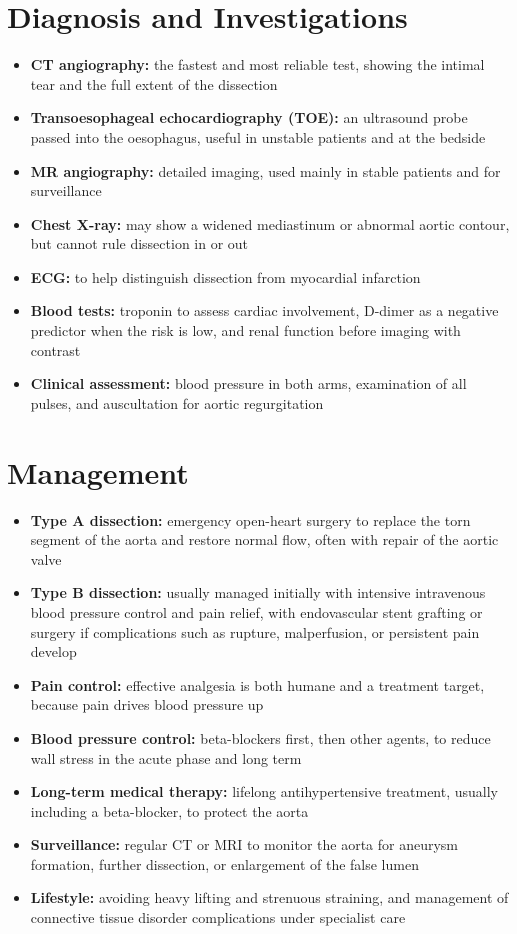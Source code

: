 \section*{Diagnosis and Investigations}
\begin{itemize}
    \item \textbf{CT angiography:} the fastest and most reliable test, showing the intimal tear and the full extent of the dissection
    \item \textbf{Transoesophageal echocardiography (TOE):} an ultrasound probe passed into the oesophagus, useful in unstable patients and at the bedside
    \item \textbf{MR angiography:} detailed imaging, used mainly in stable patients and for surveillance
    \item \textbf{Chest X-ray:} may show a widened mediastinum or abnormal aortic contour, but cannot rule dissection in or out
    \item \textbf{ECG:} to help distinguish dissection from myocardial infarction
    \item \textbf{Blood tests:} troponin to assess cardiac involvement, D-dimer as a negative predictor when the risk is low, and renal function before imaging with contrast
    \item \textbf{Clinical assessment:} blood pressure in both arms, examination of all pulses, and auscultation for aortic regurgitation
\end{itemize}

\section*{Management}
\begin{itemize}
    \item \textbf{Type A dissection:} emergency open-heart surgery to replace the torn segment of the aorta and restore normal flow, often with repair of the aortic valve
    \item \textbf{Type B dissection:} usually managed initially with intensive intravenous blood pressure control and pain relief, with endovascular stent grafting or surgery if complications such as rupture, malperfusion, or persistent pain develop
    \item \textbf{Pain control:} effective analgesia is both humane and a treatment target, because pain drives blood pressure up
    \item \textbf{Blood pressure control:} beta-blockers first, then other agents, to reduce wall stress in the acute phase and long term
    \item \textbf{Long-term medical therapy:} lifelong antihypertensive treatment, usually including a beta-blocker, to protect the aorta
    \item \textbf{Surveillance:} regular CT or MRI to monitor the aorta for aneurysm formation, further dissection, or enlargement of the false lumen
    \item \textbf{Lifestyle:} avoiding heavy lifting and strenuous straining, and management of connective tissue disorder complications under specialist care
\end{itemize}

